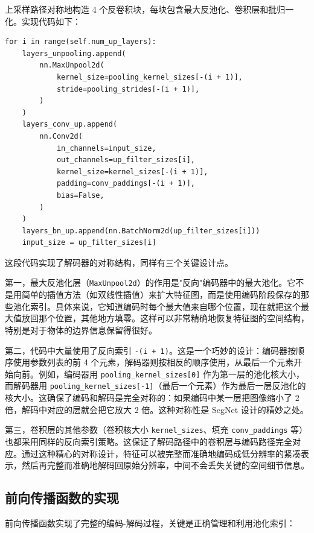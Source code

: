 \documentclass[a4paper]{article}
\begin{document}
上采样路径对称地构造 4 个反卷积块，每块包含最大反池化、卷积层和批归一化。实现代码如下：

\begin{lstlisting}
for i in range(self.num_up_layers):
    layers_unpooling.append(
        nn.MaxUnpool2d(
            kernel_size=pooling_kernel_sizes[-(i + 1)],
            stride=pooling_strides[-(i + 1)],
        )
    )
    layers_conv_up.append(
        nn.Conv2d(
            in_channels=input_size,
            out_channels=up_filter_sizes[i],
            kernel_size=kernel_sizes[-(i + 1)],
            padding=conv_paddings[-(i + 1)],
            bias=False,
        )
    )
    layers_bn_up.append(nn.BatchNorm2d(up_filter_sizes[i]))
    input_size = up_filter_sizes[i]
\end{lstlisting}

这段代码实现了解码器的对称结构，同样有三个关键设计点。

第一，最大反池化层（\texttt{MaxUnpool2d}）的作用是"反向"编码器中的最大池化。它不是用简单的插值方法（如双线性插值）来扩大特征图，而是使用编码阶段保存的那些池化索引。具体来说，它知道编码时每个最大值来自哪个位置，现在就把这个最大值放回那个位置，其他地方填零。这样可以非常精确地恢复特征图的空间结构，特别是对于物体的边界信息保留得很好。

第二，代码中大量使用了反向索引 \texttt{-(i + 1)}。这是一个巧妙的设计：编码器按顺序使用参数列表的前 4 个元素，解码器则按相反的顺序使用，从最后一个元素开始向前。例如，编码器用 \texttt{pooling\_kernel\_sizes[0]} 作为第一层的池化核大小，而解码器用 \texttt{pooling\_kernel\_sizes[-1]}（最后一个元素）作为最后一层反池化的核大小。这确保了编码和解码是完全对称的：如果编码中某一层把图像缩小了 2 倍，解码中对应的层就会把它放大 2 倍。这种对称性是 SegNet 设计的精妙之处。

第三，卷积层的其他参数（卷积核大小 \texttt{kernel\_sizes}、填充 \texttt{conv\_paddings} 等）也都采用同样的反向索引策略。这保证了解码路径中的卷积层与编码路径完全对应。通过这种精心的对称设计，特征可以被完整而准确地编码成低分辨率的紧凑表示，然后再完整而准确地解码回原始分辨率，中间不会丢失关键的空间细节信息。

\subsection{前向传播函数的实现}

前向传播函数实现了完整的编码-解码过程，关键是正确管理和利用池化索引：
\end{document}
